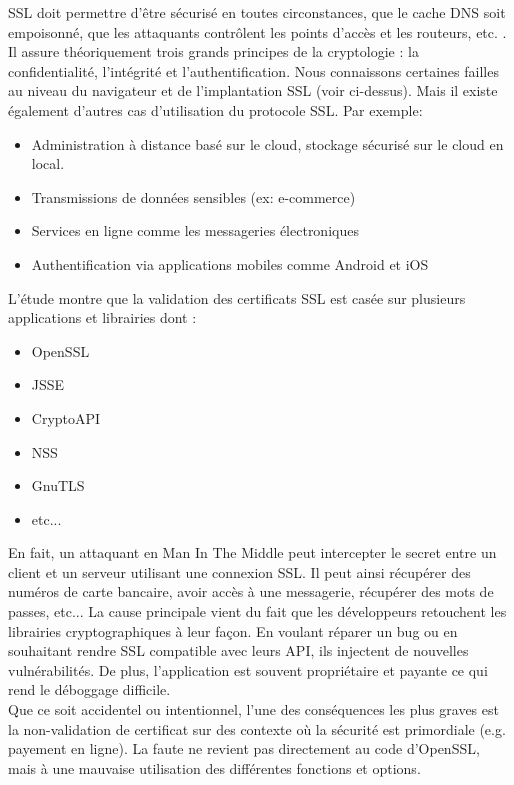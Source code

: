 SSL doit permettre d'être sécurisé en toutes circonstances, que le cache DNS soit empoisonné, que les attaquants contrôlent les points d'accès et les routeurs, etc. . Il assure théoriquement trois grands principes de la cryptologie : la confidentialité, l'intégrité et l'authentification. Nous connaissons certaines failles au niveau du navigateur et de l'implantation SSL (voir ci-dessus). Mais il existe également d'autres cas d'utilisation du protocole SSL. Par exemple:
\begin{itemize}
\item Administration à distance basé sur le cloud, stockage sécurisé sur le cloud en local.
\item Transmissions de données sensibles (ex: e-commerce)
\item Services en ligne comme les messageries électroniques
\item Authentification via applications mobiles comme Android et iOS\\
\end{itemize}

L'étude montre que la validation des certificats SSL est casée sur plusieurs applications et librairies dont :
\begin{itemize}
\item OpenSSL
\item JSSE
\item CryptoAPI
\item NSS
\item GnuTLS
\item etc...\\
\end{itemize}

En fait, un attaquant en Man In The Middle peut intercepter le secret entre un client et un serveur utilisant une connexion SSL. Il peut ainsi récupérer des numéros de carte bancaire, avoir accès à une messagerie, récupérer des mots de passes, etc... La cause principale vient du fait que les développeurs retouchent les librairies cryptographiques à leur façon. En voulant réparer un bug ou en souhaitant rendre SSL compatible avec leurs API, ils injectent de nouvelles vulnérabilités. De plus, l'application est souvent propriétaire et payante ce qui rend le déboggage difficile.\\


Que ce soit accidentel ou intentionnel, l'une des conséquences les plus graves est la non-validation de certificat sur des contexte où la sécurité est primordiale (e.g. payement en ligne). La faute ne revient pas directement au code d'OpenSSL, mais à une mauvaise utilisation des différentes fonctions et options.\\



